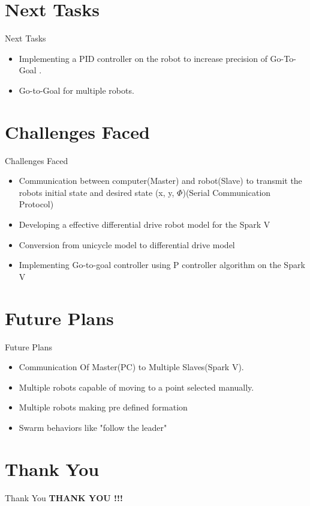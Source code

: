 \documentclass[11pt, a4paper]{beamer}
\begin{document}

\section{Next Tasks}
\begin{frame}{Next Tasks}
\begin{itemize}
\item Implementing a PID controller on the robot to increase precision of Go-To-Goal .
	
	\item Go-to-Goal for multiple robots.
	
\end{itemize}	
\end{frame}

\section{Challenges Faced}
\begin{frame}{Challenges Faced}
	\begin{itemize}
		\item Communication between computer(Master) and robot(Slave) to transmit the robots initial state and desired state (x, y, $\Phi$)(Serial Communication Protocol)
		\item Developing a effective differential drive robot  model for the Spark V
		\item Conversion from unicycle model to differential drive model
		\item Implementing  Go-to-goal controller using P controller algorithm on the Spark V
	\end{itemize}
\end{frame}

\section{Future Plans}
\begin{frame}{Future Plans}
	\begin{itemize}
	\item Communication Of Master(PC) to Multiple Slaves(Spark V).
		\item Multiple robots capable of moving to a point selected manually.
		\item Multiple robots making pre defined formation
		\item Swarm behaviors like "follow the leader"
	\end{itemize}
\end{frame}


\section{Thank You}
\begin{frame}{Thank You}
	\centering \textbf{THANK YOU !!!}
\end{frame}
\end{document}

